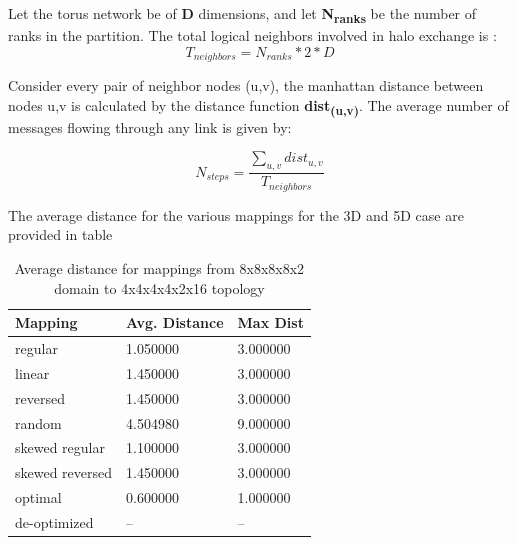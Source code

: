 \documentclass{acm_proc_article-sp}
\begin{document}
Let the torus network be of \textbf{D} dimensions, and let \textbf{N\textsubscript{ranks}} be the number of ranks in the partition.
The total logical neighbors involved in halo exchange is :
\begin{equation}
  T_{neighbors} = N_{ranks} * 2 * D
\end{equation}

Consider every pair of neighbor nodes (u,v), the manhattan distance between nodes u,v is calculated by the distance function \textbf{dist\textsubscript{(u,v)}}.
The average number of messages flowing through any link is given by:

\begin{equation}
  N_{steps} = \frac{ \sum\limits_{u,v} dist_{u,v} } {T_{neighbors}}
\end{equation}

The average distance for the various mappings for the 3D and 5D case are provided in table


\begin{table}
  \caption{Average distance for mappings from 8x8x8x8x2 domain to 4x4x4x4x2x16 topology}
  {\footnotesize
    \begin{tabular}{| l | l | p{1.5cm} |}
    \hline
    Mapping         & Avg. Distance & Max Dist\\ \hline
    regular         & 1.050000 & 3.000000\\ \hline
    linear          & 1.450000 & 3.000000\\ \hline
    reversed        & 1.450000 & 3.000000\\ \hline
    random          & 4.504980 & 9.000000\\ \hline
    skewed regular  & 1.100000 & 3.000000\\ \hline
    skewed reversed & 1.450000 & 3.000000\\ \hline
    optimal         & 0.600000 & 1.000000\\ \hline
    de-optimized    & --       & --      \\ \hline
    \hline
    \end{tabular}
  }
\end{table}
\end{document}
